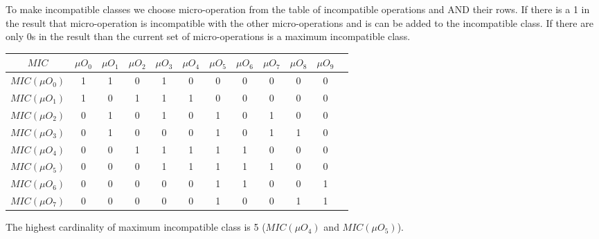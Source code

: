 To make incompatible classes we choose micro-operation from the table of incompatible operations and AND their rows.
If there is a 1 in the result that micro-operation is incompatible with the other micro-operations and is can be
added to the incompatible class. If there are only 0s in the result than the current set of micro-operations is a maximum incompatible class.
\begin{table}[H]
    \centering
    \begin{tabular}{|c|c|c|c|c|c|c|c|c|c|c|c|}
        \hline
        $MIC$ & $\mu O_{0}$ & $\mu O_{1}$ & $\mu O_{2}$ & $\mu O_{3}$ & $\mu O_{4}$ & $\mu O_{5}$ & $\mu O_{6}$ & $\mu O_{7}$ & $\mu O_{8}$ & $\mu O_{9}$ \\ \hline
        $MIC(\mu O_{0})$ & 1 & 1 & 0 & 1 & 0 & 0 & 0 & 0 & 0 & 0 \\ \hline
        $MIC(\mu O_{1})$ & 1 & 0 & 1 & 1 & 1 & 0 & 0 & 0 & 0 & 0 \\ \hline
        $MIC(\mu O_{2})$ & 0 & 1 & 0 & 1 & 0 & 1 & 0 & 1 & 0 & 0 \\ \hline
        $MIC(\mu O_{3})$ & 0 & 1 & 0 & 0 & 0 & 1 & 0 & 1 & 1 & 0 \\ \hline
        $MIC(\mu O_{4})$ & 0 & 0 & 1 & 1 & 1 & 1 & 1 & 0 & 0 & 0 \\ \hline
        $MIC(\mu O_{5})$ & 0 & 0 & 0 & 1 & 1 & 1 & 1 & 1 & 0 & 0 \\ \hline
        $MIC(\mu O_{6})$ & 0 & 0 & 0 & 0 & 0 & 1 & 1 & 0 & 0 & 1 \\ \hline
        $MIC(\mu O_{7})$ & 0 & 0 & 0 & 0 & 0 & 1 & 0 & 0 & 1 & 1 \\ \hline
    \end{tabular}
\end{table}

The highest cardinality of maximum incompatible class is 5 ($MIC(\mu O_{4})$ and $MIC(\mu O_{5})$).